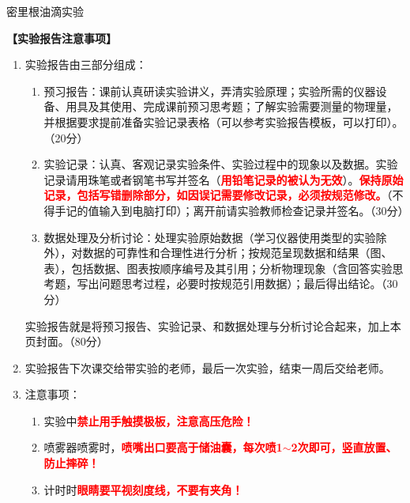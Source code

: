 \documentclass[dvipsnames, svgnames,a4paper,11pt]{article}
\begin{document}

\infoTable{}{}{}{}{}{} %

\begin{center}
	\LARGE 密里根油滴实验
\end{center}

\textbf{【实验报告注意事项】}
\begin{enumerate}
	\item 实验报告由三部分组成：
	\begin{enumerate}
		\item 预习报告：课前认真研读实验讲义，弄清实验原理；实验所需的仪器设备、用具及其使用、完成课前预习思考题；了解实验需要测量的物理量，并根据要求提前准备实验记录表格（可以参考实验报告模板，可以打印）。（20分）
	    \item 实验记录：认真、客观记录实验条件、实验过程中的现象以及数据。实验记录请用珠笔或者钢笔书写并签名（\textcolor{red}{\textbf{用铅笔记录的被认为无效}}）。\textcolor{red}{\textbf{保持原始记录，包括写错删除部分，如因误记需要修改记录，必须按规范修改。}}（不得手记的值输入到电脑打印）；离开前请实验教师检查记录并签名。（30分）
	    \item 数据处理及分析讨论：处理实验原始数据（学习仪器使用类型的实验除外），对数据的可靠性和合理性进行分析；按规范呈现数据和结果（图、表），包括数据、图表按顺序编号及其引用；分析物理现象（含回答实验思考题，写出问题思考过程，必要时按规范引用数据）；最后得出结论。（30分）
	\end{enumerate}
	实验报告就是将预习报告、实验记录、和数据处理与分析讨论合起来，加上本页封面。（80分）
	\item 实验报告下次课交给带实验的老师，最后一次实验，结束一周后交给老师。
	\item 注意事项：
	\begin{enumerate}
		\item 实验中\textcolor{red}{\textbf{禁止用手触摸极板，注意高压危险！}}
		\item 喷雾器喷雾时，\textcolor{red}{\textbf{喷嘴出口要高于储油囊，每次喷1$\sim$2次即可，竖直放置、防止摔碎！}}
		\item 计时时\textcolor{red}{\textbf{眼睛要平视刻度线，不要有夹角！}}
	\end{enumerate}
\end{enumerate}


\setcounter{section}{0}
	
\end{document}
